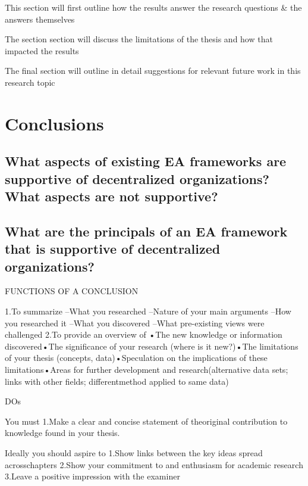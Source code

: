 This section will first outline how the results answer the research questions \& the answers themselves

The section section will discuss the limitations of the thesis and how that impacted the results


The final section will outline in detail suggestions for relevant future work in this research topic 



\section{Conclusions}
\label{sec:conclusions}

\subsection{What aspects of existing EA frameworks are supportive of decentralized organizations? What aspects are not supportive?}


\subsection{What are the principals of an EA framework that is supportive of decentralized organizations?}





FUNCTIONS OF A CONCLUSION

1.To summarize
 –What you researched –Nature of your main arguments –How you researched it –What you discovered –What pre-existing views were challenged
2.To provide an overview of 
•The new knowledge or information discovered•The significance of your research (where is it new?)•The limitations of your thesis (concepts, data)•Speculation on the implications of these limitations•Areas for further development and research(alternative data sets; links with other fields; differentmethod applied to same data)


DOs

You must 
1.Make a clear and concise statement of theoriginal contribution to knowledge found in your thesis.

Ideally you should aspire to
1.Show links between the key ideas spread acrosschapters
2.Show your commitment to and enthusiasm for academic research
3.Leave a positive impression with the examiner


